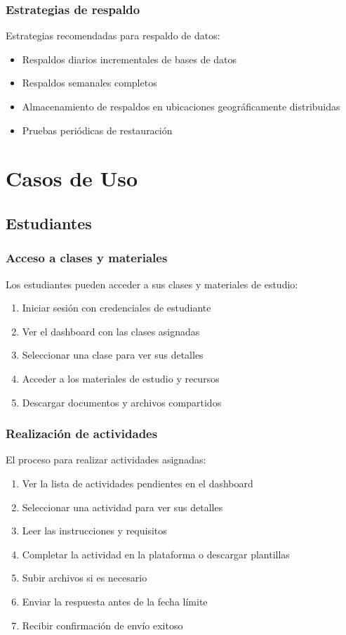 \documentclass[12pt,a4paper]{report}
\begin{document}
\subsection{Estrategias de respaldo}
Estrategias recomendadas para respaldo de datos:

\begin{itemize}
    \item Respaldos diarios incrementales de bases de datos
    \item Respaldos semanales completos
    \item Almacenamiento de respaldos en ubicaciones geográficamente distribuidas
    \item Pruebas periódicas de restauración
\end{itemize}

\chapter{Casos de Uso}
\section{Estudiantes}
\subsection{Acceso a clases y materiales}
Los estudiantes pueden acceder a sus clases y materiales de estudio:

\begin{enumerate}
    \item Iniciar sesión con credenciales de estudiante
    \item Ver el dashboard con las clases asignadas
    \item Seleccionar una clase para ver sus detalles
    \item Acceder a los materiales de estudio y recursos
    \item Descargar documentos y archivos compartidos
\end{enumerate}

\subsection{Realización de actividades}
El proceso para realizar actividades asignadas:

\begin{enumerate}
    \item Ver la lista de actividades pendientes en el dashboard
    \item Seleccionar una actividad para ver sus detalles
    \item Leer las instrucciones y requisitos
    \item Completar la actividad en la plataforma o descargar plantillas
    \item Subir archivos si es necesario
    \item Enviar la respuesta antes de la fecha límite
    \item Recibir confirmación de envío exitoso
\end{enumerate}
\end{document}
